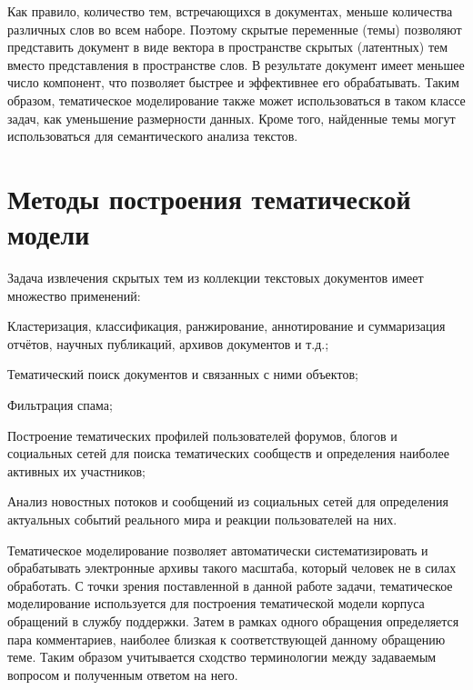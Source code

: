 Как правило, количество тем, встречающихся в документах, меньше количества различных слов во всем наборе. Поэтому скрытые переменные (темы) позволяют представить документ в виде вектора в пространстве скрытых (латентных) тем вместо представления в пространстве слов. В результате документ имеет меньшее число компонент, что позволяет быстрее и эффективнее его обрабатывать. Таким образом, тематическое моделирование также может использоваться в таком классе задач, как уменьшение размерности данных. Кроме того, найденные темы могут использоваться для семантического анализа текстов. 

\section{Методы построения тематической модели}
\label{sec:tm_techniques}

Задача извлечения скрытых тем из коллекции текстовых документов имеет множество применений: 

\begin{itemize*}
\item Кластеризация, классификация, ранжирование, аннотирование и суммаризация отчётов, научных публикаций, архивов документов и т.д.; 
\item Тематический поиск документов и связанных с ними объектов;
\item Фильтрация спама; 
\item Построение тематических профилей пользователей форумов, блогов и социальных сетей для поиска тематических сообществ и определения наиболее активных их участников; 
\item Анализ новостных потоков и сообщений из социальных сетей для определения актуальных событий реального мира и реакции пользователей на них.
\end{itemize*}

Тематическое моделирование позволяет автоматически систематизировать и обрабатывать электронные архивы такого масштаба, который человек не в силах обработать. С точки зрения поставленной в данной работе задачи, тематическое моделирование используется для построения тематической модели корпуса обращений в службу поддержки. Затем в рамках одного обращения определяется пара комментариев, наиболее близкая к соответствующей данному обращению теме. Таким образом учитывается сходство терминологии между задаваемым вопросом и полученным ответом на него.

